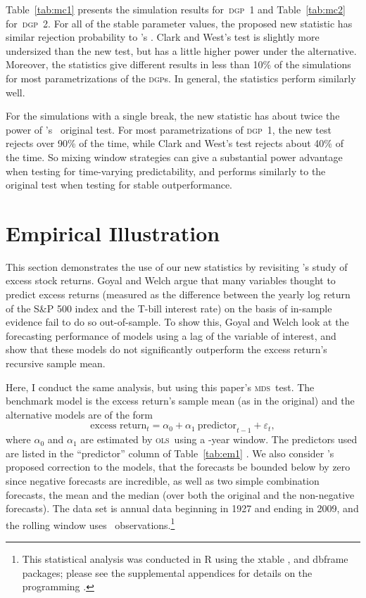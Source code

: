 \documentclass[11pt,fleqn]{article}
\newcommand\citepos[2][]{\citeauthor{#2}'s \citeyearpar[#1]{#2}}
\newcommand\poscw{\citeauthor{ClW:06}'s \citeyearpar{ClW:06,ClW:07}}
\theoremstyle{definition}
\newcommand{\dgp}{\textsc{dgp}}
\newcommand{\mds}{\textsc{mds}}
\newcommand{\ols}{\textsc{ols}}
\begin{document}
Table~\ref{tab:mc1} presents the simulation results for~\textsc{dgp}~1
and Table~\ref{tab:mc2} for~\textsc{dgp}~2.  For all of the stable
parameter values, the proposed new statistic has similar rejection
probability to \citepos{ClW:07}.  Clark and West's test is slightly
more undersized than the new test, but has a little higher power under
the alternative.  Moreover, the statistics give different results in
less than 10\% of the simulations for most parametrizations of the
\dgp s.  In general, the statistics perform similarly well.

For the simulations with a single break, the new statistic has about
twice the power of \poscw\ original test.  For most parametrizations
of \dgp\ 1, the new test rejects over 90\% of the time, while Clark
and West's test rejects about 40\% of the time.  So mixing window
strategies can give a substantial power advantage when testing for
time-varying predictability, and performs similarly to the original
test when testing for stable outperformance.

\section{Empirical Illustration}\label{sec:3}

This section demonstrates the use of our new statistics by revisiting
\citepos{GoW:08} study of excess stock returns.  Goyal and Welch argue
that many variables thought to predict excess returns (measured as the
difference between the yearly log return of the S\&P 500 index and the
T-bill interest rate) on the basis of in-sample evidence fail to do so
out-of-sample.  To show this, Goyal and Welch look at the forecasting
performance of models using a lag of the variable of interest, and
show that these models do not significantly outperform the excess
return's recursive sample mean.

Here, I conduct the same analysis, but using this paper's \mds\ test.
The benchmark model is the excess return's sample mean (as in the
original) and the alternative models are of the form
\[\text{excess return}_{t} = \alpha_{0} + \alpha_{1}\ 
\text{predictor}_{t-1} + \varepsilon_{t},\] where $\alpha_{0}$ and
$\alpha_{1}$ are estimated by \ols\ using a \windowlength-year window.
The predictors used are listed in the ``predictor'' column of
Table~\ref{tab:em1} \citep[see][for a detailed description of the
variables]{GoW:08}.  We also consider \citepos{CaT:08} proposed
correction to the models, that the forecasts be bounded below by zero
since negative forecasts are incredible, as well as two simple
combination forecasts, the mean and the median (over both the original
and the non-negative forecasts).  The data set is annual data
beginning in 1927 and ending in 2009, and the rolling window uses
\windowlength\ observations.\footnote{This statistical analysis was
  conducted in R \citep{R} using the xtable
  \citep[version~1.6-0]{Dah:09}, and dbframe \citep[version
  0.2.5]{Cal:10b} packages; please see the supplemental appendices for
  details on the programming \citep{Cal:11f}.}
\end{document}
